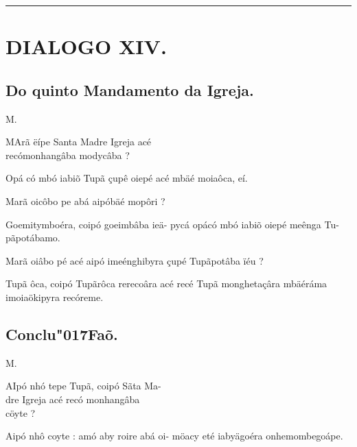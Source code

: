 \documentclass[openany,titlepage,12pt]{book}
\renewcommand{\chaptermark}[1]{\markboth{#1}{}}
\renewcommand{\sectionmark}[1]{\gdef\rightmark{#1}}
\newcommand{\lgS}{\char"017F}
\newcommand{\comecalista}[5]{
    \hspace*{-11.7pt}
    \begin{minipage}[t]{0.08\linewidth}
        \flushright #1\\#2
    \end{minipage}
    \hspace{0pt}
    \begin{minipage}[t]{0.94\linewidth}
        \lettrine
        [findent =2pt, nindent=0pt,  lines=2]
        {#3}{#4}#5
    \end{minipage}
    \vspace*{-3pt}
}
\begin{document}
\newpage

\vspace{2pt}
\par\noindent\rule{\textwidth}{0.4pt}
\unskip\vspace*{2pt}
\section{DIALOGO XIV.}
\unskip\vspace{2pt}
\subsection{Do quinto Mandamento da Igreja.}

\chaptermark{Dialogo XIV.}
\sectionmark{Do Iejum.}
\vspace*{2pt}

\comecalista{M.}{}{M}{A}
{rã ëípe Santa Madre Igreja acé\\
\hspace*{2ex}recómonhangâba modycâba ?
}

\begin{altereven}
    \item Opá có mbó iabiõ Tupã çupê oiepé acé
        mbäé moiaôca, eí.
    \item Marã oicôbo pe abá aipóbäé mopôri ?
    \item Goemitymboéra, coipó goeimbâba ieä-
        pycá opácó mbó iabiõ oiepé meênga Tu-
        pãpotábamo.
    \item Marã oiâbo pé acé aipó imeénghibyra\linebreak
        çupé Tupãpotâba ïéu ?
    \item Tupã ôca, coipó Tupãrôca rerecoâra acé
        recé Tupã monghetaçâra mbäéráma\linebreak
        imoiaökipyra recóreme.
\end{altereven}

\subsection{Conclu\lgS aõ.}

\comecalista{M.}{}{A}{I}
{pó nhó tepe Tupã, coipó Sãta Ma-\\
\hspace*{2ex}dre Igreja acé recó monhangâba\\
\hspace*{6.5ex}cöyte ?
}
\begin{altereven}
    \item Aipó nhô coyte : amó aby roire abá oi-
        möacy eté iabyägoéra onhemombegoápe.

\end{altereven}
\end{document}
